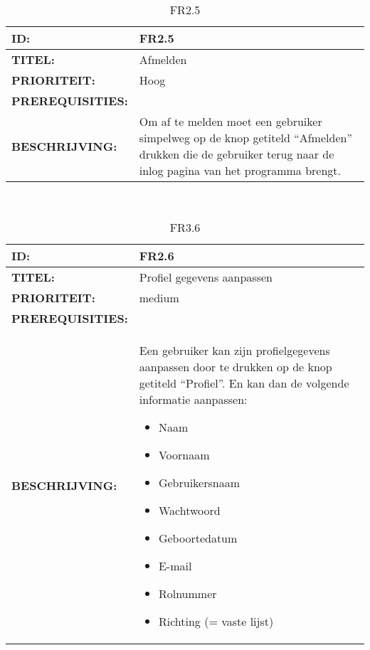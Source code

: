 \noindent\begin{table}[h]
            \begin{tabular}{l | p{10cm}}
                \textbf{ID:} & FR2.5 \\ \hline
                \textbf{TITEL:} & Afmelden\\ \hline
                \textbf{PRIORITEIT:} &  Hoog \\ \hline
                \textbf{PREREQUISITIES:} & \\ \hline
                \textbf{BESCHRIJVING:} & Om af te melden moet een gebruiker simpelweg op de knop getiteld “Afmelden” drukken die de gebruiker terug naar de inlog pagina van het programma brengt.\\
            \end{tabular}\\
            \caption{FR2.5}
            \label{tab:myeleventhtable}
        \end{table}


\noindent\begin{table}[h]
            \begin{tabular}{l | p{10cm}}
                \textbf{ID:} & FR2.6 \\ \hline
                \textbf{TITEL:} & Profiel gegevens aanpassen\\ \hline
                \textbf{PRIORITEIT:} &  medium \\ \hline
                \textbf{PREREQUISITIES:} & \\ \hline
                \textbf{BESCHRIJVING:} & Een gebruiker kan zijn profielgegevens aanpassen door te drukken op de knop getiteld “Profiel”. 
                                        En kan dan de volgende informatie aanpassen:
                                        \begin{itemize}\itemsep1pt \parskip0pt \parsep0pt
                                        \item Naam
                                        \item Voornaam
                                        \item Gebruikersnaam
                                        \item Wachtwoord
                                        \item Geboortedatum
                                        \item E-mail
                                        \item Rolnummer
                                        \item Richting (= vaste lijst)
                                        \end{itemize}\\
            \end{tabular}\\
            \caption{FR3.6}
            \label{tab:mytwelfthtable}
        \end{table}



